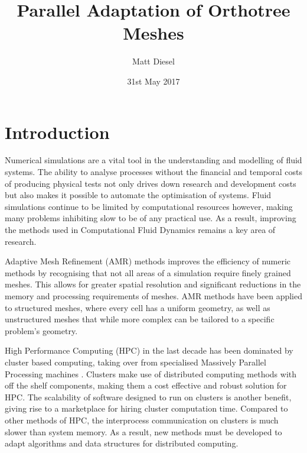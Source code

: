 \documentclass[twoside]{IIBproject}
\numberwithin{figure}{section}
\begin{document}
\date{31st May 2017}
\author{Matt Diesel}
\title{Parallel Adaptation of Orthotree Meshes}

\pagestyle{empty}
\maketitle

\thispagestyle{empty}
\renewcommand{\abstractname}{Technical Abstract}
\begin{abstract}

\end{abstract}

\newpage
\setcounter{tocdepth}{2}
\tableofcontents
\newpage
\pagestyle{plain}


\section{Introduction} %
    \label{sec:intro}

    Numerical simulations are a vital tool in the understanding and modelling of fluid systems. The ability to analyse processes without the financial and temporal costs of producing physical tests not only drives down research and development costs but also makes it possible to automate the optimisation of systems. Fluid simulations continue to be limited by computational resources however, making many problems inhibiting slow to be of any practical use. As a result, improving the methods used in Computational Fluid Dynamics remains a key area of research.

    Adaptive Mesh Refinement (AMR) methods improves the efficiency of numeric methods by recognising that not all areas of a simulation require finely grained meshes. This allows for greater spatial resolution and significant reductions in the memory and processing requirements of meshes. AMR methods have been applied to structured meshes, where every cell has a uniform geometry, as well as unstructured meshes that while more complex can be tailored to a specific problem's geometry. 

    High Performance Computing (HPC) in the last decade has been dominated by cluster based computing, taking over from specialised Massively Parallel Processing machines \cite{top500}. Clusters make use of distributed computing methods with off the shelf components, making them a cost effective and robust solution for HPC. The scalability of software designed to run on clusters is another benefit, giving rise to a marketplace for hiring cluster computation time. Compared to other methods of HPC, the interprocess communication on clusters is much slower than system memory. As a result, new methods must be developed to adapt algorithms and data structures for distributed computing.
\end{document}
